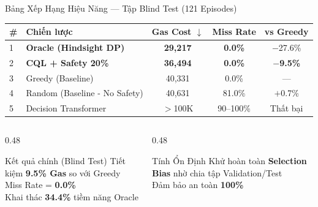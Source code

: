 \documentclass[aspectratio=169, 12pt, xcolor=table]{beamer}
\begin{document}
\begin{frame}{Bảng Xếp Hạng Hiệu Năng — Tập Blind Test (121 Episodes)}
  \begin{table}
    \centering
    \begin{tabular}{llccc}
      \toprule
      \textbf{\#} & \textbf{Chiến lược} & \textbf{Gas Cost $\downarrow$} & \textbf{Miss Rate} & \textbf{vs Greedy} \\
      \midrule
      1 & \textbf{Oracle (Hindsight DP)} & \textbf{29,217} & \textbf{0.0\%} & $-$27.6\% \\
      \rowcolor{UTHblue!15}
      2 & \textbf{CQL + Safety 20\%} & \textbf{36,494} & \textbf{0.0\%} & \textbf{$-$9.5\%} \\
      3 & Greedy (Baseline) & 40,331 & 0.0\% & --- \\
      4 & Random (Baseline - No Safety) & 40,631 & 81.0\% & $+$0.7\% \\
      5 & Decision Transformer & $>$100K & 90--100\% & Thất bại \\
      \bottomrule
    \end{tabular}
  \end{table}

  \vspace{0.5em}
  \begin{columns}[T]
    \begin{column}{0.48\textwidth}
      \begin{alertblock}{Kết quả chính (Blind Test)}
        Tiết kiệm \textbf{9.5\% Gas} so với Greedy\\
        Miss Rate = \textbf{0.0\%}\\
        Khai thác \textbf{34.4\%} tiềm năng Oracle
      \end{alertblock}
    \end{column}
    \begin{column}{0.48\textwidth}
      \begin{block}{Tính Ổn Định}
        Khử hoàn toàn \textbf{Selection Bias} nhờ chia tập Validation/Test\\
        Đảm bảo an toàn \textbf{100\%}
      \end{block}
    \end{column}
  \end{columns}
\end{frame}
\end{document}
